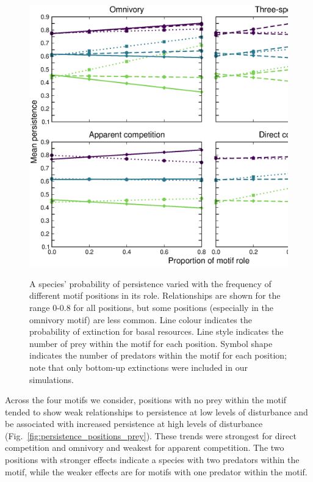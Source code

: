 \documentclass[12pt]{article}
\begin{document}
\begin{spacing}{2.0}
        
        \begin{figure}[h!]
        \includegraphics[width=.95\textwidth]{figures/persistence_positions_bymotif.eps}
        \label{figs:persistence_position_motifs}
        \caption{A species' probability of persistence varied with the frequency of different motif positions in its role. Relationships are shown for the range 0-0.8 for all positions, but some positions (especially in the omnivory motif) are less common. Line colour indicates the probability of extinction for basal resources. Line style indicates the number of prey within the motif for each position. Symbol shape indicates the number of predators within the motif for each position; note that only bottom-up extinctions were included in our simulations.}
        \end{figure}
                
        Across the four motifs we consider, positions with no prey within the motif tended to show weak relationships to persistence at low levels of disturbance and be associated with increased persistence at high levels of disturbance (Fig.~\ref{fig:persistence_positions_prey}).
        These trends were strongest for direct competition and omnivory and weakest for apparent competition.
        The two positions with stronger effects indicate a species with two predators within the motif, while the weaker effects are for motifs with one predator within the motif.



\end{spacing}
\end{document}
